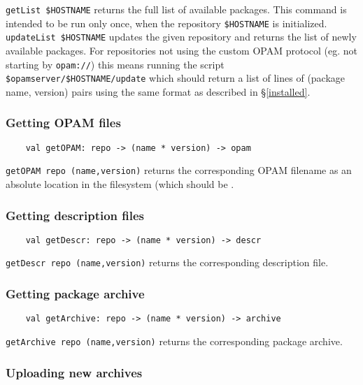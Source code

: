 \documentclass[a4paper,11pt]{article}
\begin{document}
\verb+getList $HOSTNAME+ returns the full list of available packages. This
command is intended to be run only once, when the repository
\verb+$HOSTNAME+ is initialized.\\

\verb+updateList $HOSTNAME+ updates the given repository and returns
the list of newly available packages. For repositories not using the
custom OPAM protocol (eg. not starting by \verb+opam://+) this means
running the script \verb+$opamserver/$HOSTNAME/update+ which should
return a list of lines of (package name, version) pairs using the same
format as described in \S\ref{installed}.

\subsubsection{Getting OPAM files}
\label{getOPAM}

\begin{verbatim}
    val getOPAM: repo -> (name * version) -> opam
\end{verbatim}

{\tt getOPAM repo (name,version)} returns the corresponding OPAM
filename as an absolute location in the filesystem (which should be .

\subsubsection{Getting description files}
\label{getOPAM}

\begin{verbatim}
    val getDescr: repo -> (name * version) -> descr
\end{verbatim}

{\tt getDescr repo (name,version)} returns the corresponding
description file.

\subsubsection{Getting package archive}
\label{getArchive}

\begin{verbatim}
    val getArchive: repo -> (name * version) -> archive
\end{verbatim}

{\tt getArchive repo (name,version)} returns the corresponding package
archive.

\subsubsection{Uploading new archives}
\label{newArchive}
\end{document}
